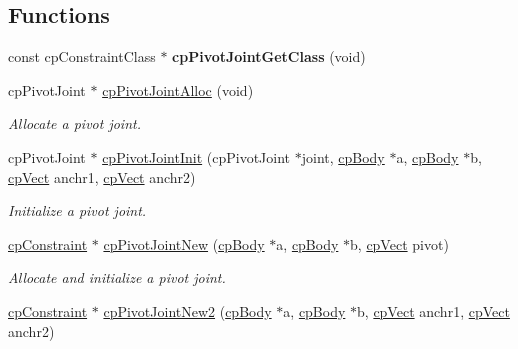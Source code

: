 \subsection*{Functions}
\begin{DoxyCompactItemize}
\item 
\hypertarget{group__cp_pivot_joint_ga4aa4683fe13b90d18cff73790ea8b3df}{const cp\-Constraint\-Class $\ast$ {\bfseries cp\-Pivot\-Joint\-Get\-Class} (void)}\label{group__cp_pivot_joint_ga4aa4683fe13b90d18cff73790ea8b3df}

\item 
\hypertarget{group__cp_pivot_joint_gac8ceffcbb474ba0ba021dee02eca5a09}{cp\-Pivot\-Joint $\ast$ \hyperlink{group__cp_pivot_joint_gac8ceffcbb474ba0ba021dee02eca5a09}{cp\-Pivot\-Joint\-Alloc} (void)}\label{group__cp_pivot_joint_gac8ceffcbb474ba0ba021dee02eca5a09}

\begin{DoxyCompactList}\small\item\em Allocate a pivot joint. \end{DoxyCompactList}\item 
\hypertarget{group__cp_pivot_joint_ga1b606a6beb26355a846196f0a5fb445f}{cp\-Pivot\-Joint $\ast$ \hyperlink{group__cp_pivot_joint_ga1b606a6beb26355a846196f0a5fb445f}{cp\-Pivot\-Joint\-Init} (cp\-Pivot\-Joint $\ast$joint, \hyperlink{structcp_body}{cp\-Body} $\ast$a, \hyperlink{structcp_body}{cp\-Body} $\ast$b, \hyperlink{structcp_vect}{cp\-Vect} anchr1, \hyperlink{structcp_vect}{cp\-Vect} anchr2)}\label{group__cp_pivot_joint_ga1b606a6beb26355a846196f0a5fb445f}

\begin{DoxyCompactList}\small\item\em Initialize a pivot joint. \end{DoxyCompactList}\item 
\hypertarget{group__cp_pivot_joint_ga56d3fd371a5f4688abcf0c279ad77a9d}{\hyperlink{structcp_constraint}{cp\-Constraint} $\ast$ \hyperlink{group__cp_pivot_joint_ga56d3fd371a5f4688abcf0c279ad77a9d}{cp\-Pivot\-Joint\-New} (\hyperlink{structcp_body}{cp\-Body} $\ast$a, \hyperlink{structcp_body}{cp\-Body} $\ast$b, \hyperlink{structcp_vect}{cp\-Vect} pivot)}\label{group__cp_pivot_joint_ga56d3fd371a5f4688abcf0c279ad77a9d}

\begin{DoxyCompactList}\small\item\em Allocate and initialize a pivot joint. \end{DoxyCompactList}\item 
\hypertarget{group__cp_pivot_joint_ga40411f1879afc3910907a49faced47f0}{\hyperlink{structcp_constraint}{cp\-Constraint} $\ast$ \hyperlink{group__cp_pivot_joint_ga40411f1879afc3910907a49faced47f0}{cp\-Pivot\-Joint\-New2} (\hyperlink{structcp_body}{cp\-Body} $\ast$a, \hyperlink{structcp_body}{cp\-Body} $\ast$b, \hyperlink{structcp_vect}{cp\-Vect} anchr1, \hyperlink{structcp_vect}{cp\-Vect} anchr2)}\label{group__cp_pivot_joint_ga40411f1879afc3910907a49faced47f0}


\end{DoxyCompactItemize}
